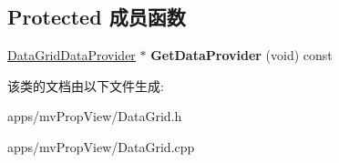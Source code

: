 \subsection*{Protected 成员函数}
\begin{DoxyCompactItemize}
\item 
\hypertarget{class_data_grid_table_a7c078903146bd9f3b328679b00b7c5ed}{\hyperlink{class_data_grid_data_provider}{Data\+Grid\+Data\+Provider} $\ast$ {\bfseries Get\+Data\+Provider} (void) const }\label{class_data_grid_table_a7c078903146bd9f3b328679b00b7c5ed}

\end{DoxyCompactItemize}


该类的文档由以下文件生成\+:\begin{DoxyCompactItemize}
\item 
apps/mv\+Prop\+View/Data\+Grid.\+h\item 
apps/mv\+Prop\+View/Data\+Grid.\+cpp\end{DoxyCompactItemize}
